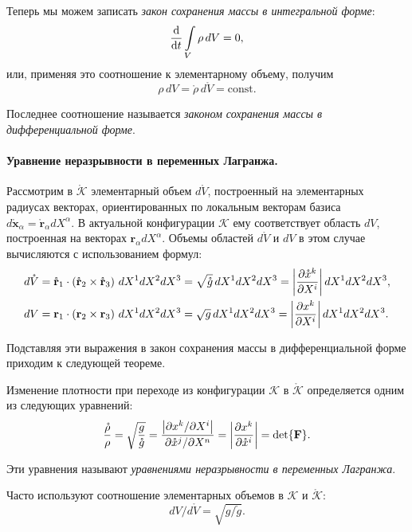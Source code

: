 Теперь мы можем записать \textit{закон сохранения массы в интегральной форме}: 
\begin{equation*}
	\dv{}{t} \int\limits_{V} \rho \, dV = 0,
\end{equation*}
или, применяя это соотношение к элементарному объему, получим
\begin{equation*}
	\rho \, dV = \mathring{\rho} \, d\mathring{V} = \mathrm{const}.
\end{equation*}

Последнее соотношение называется \textit{законом сохранения массы в дифференциальной форме}. 

\paragraph{Уравнение неразрывности в переменных Лагранжа.} Рассмотрим в $\mathring{\mathcal{K}}$ элементарный объем $d\mathring{V}$, построенный на элементарных радиусах векторах, ориентированных по локальным векторам базиса $d\mathring{\mathbf{x}}_{\alpha} = \mathring{\mathbf{r}}_{\alpha} d X^{\alpha}$. В актуальной конфигурации $\mathcal{K}$ ему соответствует область $dV$, построенная на векторах $\mathbf{r}_{\alpha} dX^{\alpha}$. Объемы областей $d\mathring{V}$ и $dV$ в этом случае вычисляются с использованием формул:
\begin{align*}
	d\mathring{V} &= \mathring{\mathbf{r}}_1 \cdot \left(\mathring{\mathbf{r}}_2 \times \mathring{\mathbf{r}}_3\right) \, dX^1 dX^2 dX^3 = \sqrt{\mathring{g}} \, dX^1 dX^2 dX^3 = \abs{\frac{\partial \mathring{x}^k}{\partial X^i}} \, dX^1 dX^2 dX^3, \\
	dV &= \mathbf{r}_1 \cdot \left(\mathbf{r}_2 \times \mathbf{r}_3\right) \, dX^1 dX^2 dX^3 = \sqrt{g} \, dX^1 dX^2 dX^3 = \abs{\frac{\partial x^k}{\partial X^i}} \, dX^1 dX^2 dX^3.
\end{align*}

Подставляя эти выражения в закон сохранения массы в дифференциальной форме приходим к следующей теореме.

\begin{theorem*}
	Изменение плотности при переходе из конфигурации $\mathcal{K}$ в $\mathring{\mathcal{K}}$ определяется одним из следующих уравнений:
	\begin{equation*}
		\frac{\mathring{\rho}}{\rho} = \sqrt{\frac{g}{\mathring{g}}} = \frac{\abs{\partial x^k / \partial X^i}}{\partial \mathring{x}^j / \partial X^n} = \abs{\frac{\partial x^k}{\partial \mathring{x}^i}} = \det{\mathbf{F}}.
	\end{equation*}
	
	Эти уравнения называют \textit{уравнениями неразрывности в переменных Лагранжа}.
	
	Часто используют соотношение элементарных объемов в $\mathcal{K}$ и $\mathring{\mathcal{K}}$:
	\begin{equation*}
		dV / d\mathring{V} = \sqrt{g / \mathring{g}}.
	\end{equation*}
\end{theorem*}
